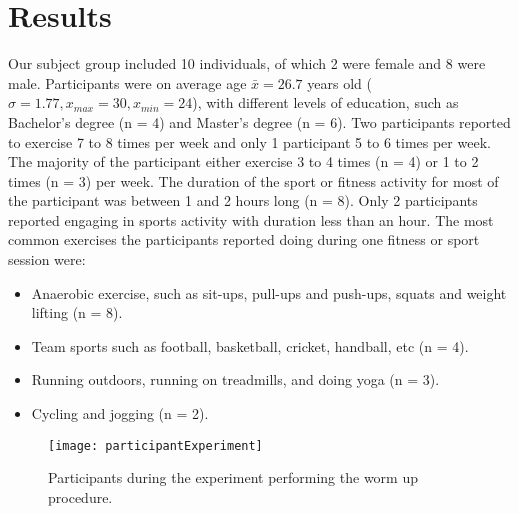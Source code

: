 \section{Results}
Our subject group included 10 individuals, of which 2 were female and 8 were male. Participants were on average age \begin{math}\bar{x} = 26.7\end{math} years old (\begin{math}\sigma = 1.77, x_{max}=30 ,x_{min}= 24 \end{math}), with different levels of education, such as Bachelor's degree (n = 4) and Master's degree (n = 6). Two participants reported to exercise 7 to 8 times per week and only 1 participant 5 to 6 times per week. The majority of the participant either exercise 3 to 4 times (n = 4) or 1 to 2 times (n = 3) per week. The duration of the sport or fitness activity for most of the participant was between 1 and 2 hours long (n = 8). Only 2 participants reported engaging in sports activity with duration less than an hour. The most common exercises the participants reported doing during one fitness or sport session were:
\begin{itemize}
\item Anaerobic exercise, such as sit-ups, pull-ups and push-ups, squats and weight lifting (n = 8).
\item Team sports such as football, basketball, cricket, handball, etc (n = 4).
\item Running outdoors, running on treadmills, and doing yoga (n = 3).
\item Cycling and jogging (n = 2).
\end{itemize}
\begin{figure}[h]
    \centering
    \texttt{[image: participantExperiment]}
    \caption{Participants during the experiment performing the worm up procedure.}
    \label{fig:participants}
\end{figure}
